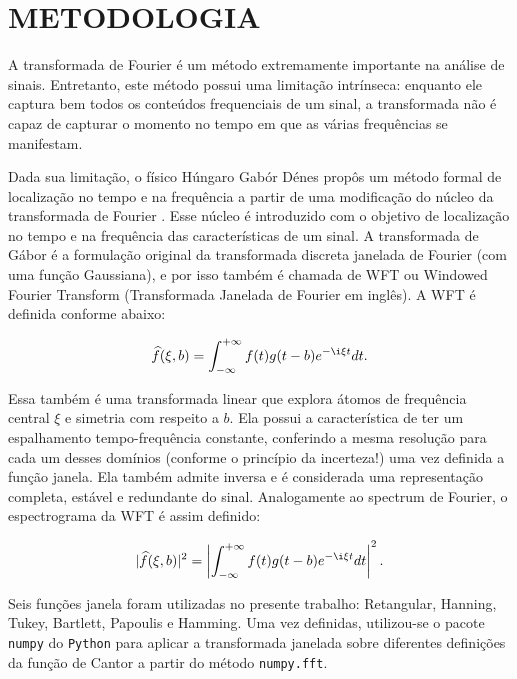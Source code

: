 
\chapter{METODOLOGIA}

A transformada de Fourier é um método extremamente importante na análise de sinais. Entretanto, este método possui uma limitação intrínseca: enquanto ele captura bem todos os conteúdos frequenciais de um sinal, a transformada não é capaz de capturar o momento no tempo em que as várias frequências se manifestam. 

Dada sua limitação, o físico Húngaro Gabór Dénes propôs um método formal de localização no tempo e na frequência a partir de uma modificação do núcleo da transformada de Fourier \cite{gabor1946theory}. Esse núcleo é introduzido com o objetivo de localização no tempo e na frequência das características de um sinal. A transformada de Gábor é a formulação original da transformada discreta janelada de Fourier (com uma função Gaussiana), e por isso também é chamada de WFT ou Windowed Fourier Transform (Transformada Janelada de Fourier em inglês). A WFT é definida conforme abaixo:

\begin{equation}
\widehat{f}(\xi, b) = \int_{-\infty}^{+\infty}f(t)g(t-b)e^{-\i \xi t}dt.
\end{equation}

Essa também é uma transformada linear que explora átomos de frequência central $\xi$ e simetria com respeito a $b$. Ela possui a característica de ter um espalhamento tempo-frequência constante, conferindo a mesma resolução para cada um desses domínios (conforme o princípio da incerteza!) uma vez definida a função janela. Ela também admite inversa e é considerada uma representação completa, estável e redundante do sinal. Analogamente ao spectrum de Fourier, o espectrograma da WFT é assim definido:

\begin{equation}
|\widehat{f}(\xi, b)|^{2} = \left|\int_{-\infty}^{+\infty}f(t)g(t-b)e^{-\i \xi t}dt\right| ^{2}.
\end{equation}

Seis funções janela foram utilizadas no presente trabalho: Retangular, Hanning, Tukey, Bartlett, Papoulis e Hamming. Uma vez definidas, utilizou-se o pacote \texttt{numpy} do \texttt{Python} para aplicar a transformada janelada sobre diferentes definições da função de Cantor a partir do método \texttt{numpy.fft}. 

